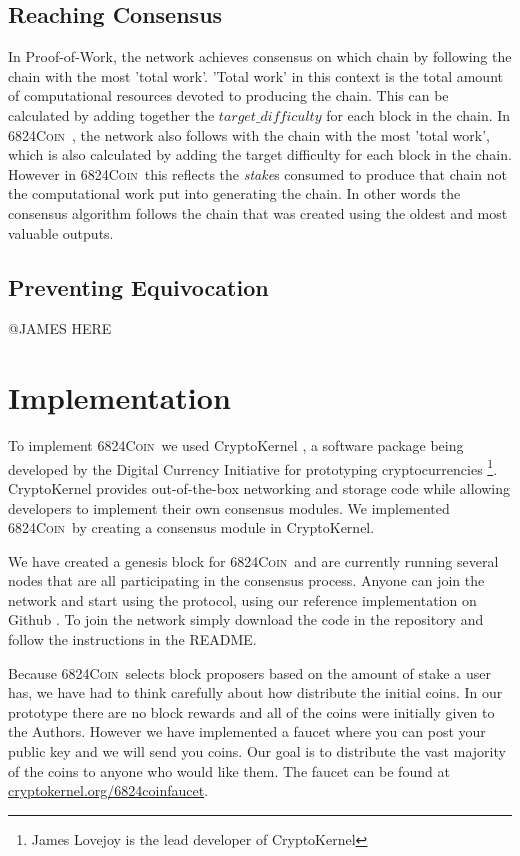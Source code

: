 \documentclass{article}
\newcommand{\coin}{ \textsc{6824Coin}\ }
\begin{document}
\subsection{Reaching Consensus}
In Proof-of-Work, the network achieves consensus on which chain by following the chain with the most 'total work'. 'Total work' in this context is the total amount of computational resources devoted to producing the chain. This can be calculated by adding together the $target\_difficulty$ for each block in the chain. In \coin, the network also follows with the chain with the most 'total work', which is also calculated by adding the target difficulty for each block in the chain. However in \coin this reflects the \textit{stake}s consumed to produce that chain not the computational work put into generating the chain. In other words the consensus algorithm follows the chain that was created using the oldest and most valuable outputs.  

\subsection{Preventing Equivocation}
@JAMES HERE 

\section{Implementation}
To implement \coin we used CryptoKernel \cite{ck}, a software package being developed by the Digital Currency Initiative for prototyping cryptocurrencies \footnote{James Lovejoy is the lead developer of CryptoKernel}. CryptoKernel provides out-of-the-box networking and storage code while allowing developers to implement their own consensus modules. We implemented \coin by creating a consensus module in CryptoKernel.

We have created a genesis block for \coin and are currently running several nodes that are all participating in the consensus process. Anyone can join the network and start using the protocol, using our reference implementation on Github \cite{6824coincode}. To join the network simply download the code in the repository and follow the instructions in the README.

Because \coin selects block proposers based on the amount of stake a user has, we have had to think carefully about how distribute the initial coins. In our prototype there are no block rewards and all of the coins were initially given to the Authors. However we have implemented a faucet where you can post your public key and we will send you coins. Our goal is to distribute the vast majority of the coins to anyone who would like them. The faucet can be found at \url{cryptokernel.org/6824coinfaucet}.
\end{document}
